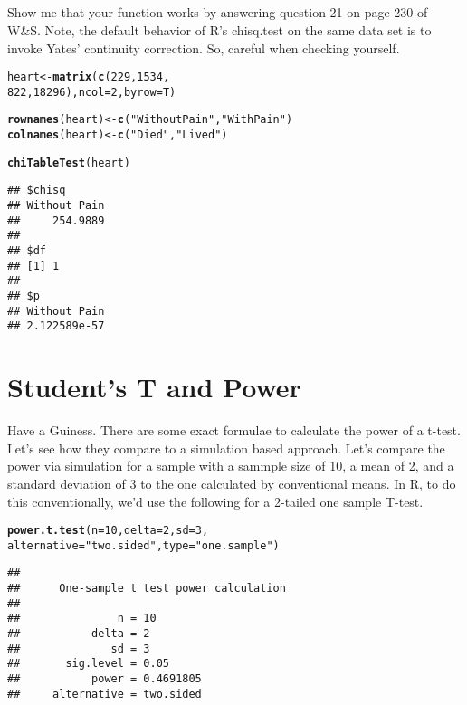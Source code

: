 \documentclass{article}\usepackage[]{graphicx}\usepackage[]{color}
\makeatletter
\newcommand{\hlnum}[1]{\textcolor[rgb]{0.686,0.059,0.569}{#1}}%
\newcommand{\hlstr}[1]{\textcolor[rgb]{0.192,0.494,0.8}{#1}}%
\newcommand{\hlstd}[1]{\textcolor[rgb]{0.345,0.345,0.345}{#1}}%
\newcommand{\hlkwb}[1]{\textcolor[rgb]{0.69,0.353,0.396}{#1}}%
\newcommand{\hlkwc}[1]{\textcolor[rgb]{0.333,0.667,0.333}{#1}}%
\newcommand{\hlkwd}[1]{\textcolor[rgb]{0.737,0.353,0.396}{\textbf{#1}}}%
\newenvironment{kframe}{%
 \def\at@end@of@kframe{}%
 \ifinner\ifhmode%
  \def\at@end@of@kframe{\end{minipage}}%
  \begin{minipage}{\columnwidth}%
 \fi\fi%
 \def\FrameCommand##1{\hskip\@totalleftmargin \hskip-\fboxsep
 \colorbox{shadecolor}{##1}\hskip-\fboxsep
     \hskip-\linewidth \hskip-\@totalleftmargin \hskip\columnwidth}%
 \MakeFramed {\advance\hsize-\width
   \@totalleftmargin\z@ \linewidth\hsize
   \@setminipage}}%
 {\par\unskip\endMakeFramed%
 \at@end@of@kframe}
\newenvironment{knitrout}{}{} %
\makeatother
\begin{document}
\subsection{}
Show me that your function works by answering question 21 on page 230 of W\&S.  Note, the default behavior of R's chisq.test on the same data set is to invoke Yates' continuity correction.  So, careful when checking yourself.
\begin{knitrout}
\color{fgcolor}\begin{kframe}
\begin{alltt}
\hlstd{heart} \hlkwb{<-} \hlkwd{matrix} \hlstd{(}\hlkwd{c}\hlstd{(} \hlnum{229}\hlstd{,} \hlnum{1534}\hlstd{,}
                    \hlnum{822}\hlstd{,} \hlnum{18296}\hlstd{),} \hlkwc{ncol}\hlstd{=}\hlnum{2}\hlstd{,} \hlkwc{byrow}\hlstd{=T)}

\hlkwd{rownames}\hlstd{(heart)} \hlkwb{<-} \hlkwd{c}\hlstd{(}\hlstr{"Without Pain"}\hlstd{,} \hlstr{"With Pain"}\hlstd{)}
\hlkwd{colnames}\hlstd{(heart)} \hlkwb{<-} \hlkwd{c}\hlstd{(}\hlstr{"Died"}\hlstd{,} \hlstr{"Lived"}\hlstd{)}

\hlkwd{chiTableTest}\hlstd{(heart)}
\end{alltt}
\begin{verbatim}
## $chisq
## Without Pain 
##     254.9889 
## 
## $df
## [1] 1
## 
## $p
## Without Pain 
## 2.122589e-57
\end{verbatim}
\end{kframe}
\end{knitrout}

\section{Student's T and Power}
Have a Guiness.  There are some exact formulae to calculate the power of a t-test.  Let's see how they compare to a simulation based approach.  Let's compare the power via simulation for a sample with a sammple size of 10, a mean of 2, and a standard deviation of 3 to the one calculated by conventional means.  In R, to do this conventionally, we'd use the following for a 2-tailed one sample T-test.
\begin{knitrout}
\color{fgcolor}\begin{kframe}
\begin{alltt}
\hlkwd{power.t.test}\hlstd{(}\hlkwc{n}\hlstd{=}\hlnum{10}\hlstd{,} \hlkwc{delta}\hlstd{=}\hlnum{2}\hlstd{,} \hlkwc{sd}\hlstd{=}\hlnum{3}\hlstd{,}
             \hlkwc{alternative}\hlstd{=}\hlstr{"two.sided"}\hlstd{,} \hlkwc{type}\hlstd{=}\hlstr{"one.sample"}\hlstd{)}
\end{alltt}
\begin{verbatim}
## 
##      One-sample t test power calculation 
## 
##               n = 10
##           delta = 2
##              sd = 3
##       sig.level = 0.05
##           power = 0.4691805
##     alternative = two.sided
\end{verbatim}
\end{kframe}
\end{knitrout}
\end{document}
